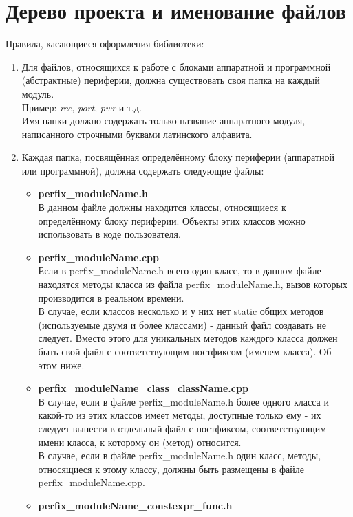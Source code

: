 \section{Дерево проекта и именование файлов}\label{dn:0}
Правила, касающиеся оформления библиотеки:
\begin{enumerate}
	\item Для файлов, относящихся к работе с блоками аппаратной и программной (абстрактные) периферии, должна существовать своя папка на каждый модуль.\\
	Пример: \textit{rcc}, \textit{port}, \textit{pwr} и т.д.\\
	Имя папки должно содержать только название аппаратного модуля, написанного строчными буквами латинского алфавита.
	
	\item Каждая папка, посвящённая определённому блоку периферии (аппаратной или программной), должна содержать следующие файлы:
	\begin{itemize}
		\item \textbf{perfix\-\_module\-Name.h}\\
		В данном файле должны находится классы, относящиеся к определённому блоку периферии. Объекты этих классов можно использовать в коде пользователя.
		\item \textbf{perfix\-\_module\-Name.cpp}\\
		Если в perfix\_moduleName.h всего один класс, то в данном файле находятся методы класса из файла perfix\_moduleName.h, вызов которых производится в реальном времени.\\
		В случае, если классов несколько и у них нет static общих методов (используемые двумя и более классами) - данный файл создавать не следует. Вместо этого для уникальных методов каждого класса должен быть свой файл с соответствующим постфиксом (именем класса). Об этом ниже.
		\item \textbf{perfix\-\_moduleName\-\_class\-\_class\-Name.cpp}\\
		В случае, если в файле perfix\-\_moduleName.h более одного класса и какой-то из этих классов имеет методы, доступные только ему - их следует вынести в отдельный файл с постфиксом, соответствующим имени класса, к которому он (метод) относится.\\
		В случае, если в файле perfix\-\_module\-Name.h один класс, методы, относящиеся к этому классу, должны быть размещены в файле perfix\_\-moduleName.cpp.
		\item \textbf{perfix\-\_module\-Name\-\_constexpr\-\_func.h}\\

\end{itemize}
\end{enumerate}
